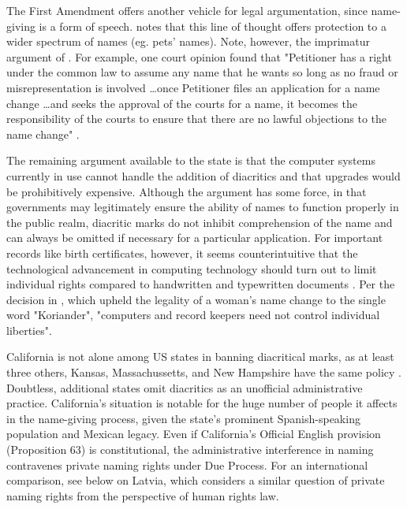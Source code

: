 The First Amendment offers another vehicle for legal argumentation, since
name-giving is a form of speech. \textcite{larson11} notes that this line of
thought offers protection to a wider spectrum of names (eg. pets' names). Note,
however, the imprimatur argument of \textcite{heymann11}. For example, one
court opinion found that "Petitioner has a right under the common law to assume
any name that he wants so long as no fraud or misrepresentation is involved
\dots once Petitioner files an application for a name change \dots and seeks
the approval of the courts for a name, it becomes the responsibility of the
courts to ensure that there are no lawful objections to the name change"
\parencite{variable08} \parencite[413]{heymann11}.

The remaining argument available to the state is that the computer systems
currently in use cannot handle the addition of diacritics and that upgrades
would be prohibitively expensive. Although the argument has some force, in that
governments may legitimately ensure the ability of names to function properly
in the public realm, diacritic marks do not inhibit comprehension of the name
and can always be omitted if necessary for a particular application. For
important records like birth certificates, however, it seems counterintuitive
that the technological advancement in computing technology should turn out to
limit individual rights compared to handwritten and typewritten documents
\parencite[191]{larson11}. Per the decision in \parencite{ferner96}, which
upheld the legality of a woman's name change to the single word "Koriander",
"computers and record keepers need not control individual liberties".

California is not alone among US states in banning diacritical marks, as at
least three others, Kansas, Massachussetts, and New Hampshire have the same
policy \parencite{larson11}. Doubtless, additional states omit diacritics as an
unofficial administrative practice. California's situation is notable for the
huge number of people it affects in the name-giving process, given the state's
prominent Spanish-speaking population and Mexican legacy. Even if California's
Official English provision (Proposition 63) is constitutional, the
administrative interference in naming contravenes private naming rights under
Due Process. For an international comparison, see below on Latvia, which
considers a similar question of private naming rights from the perspective of
human rights law.
